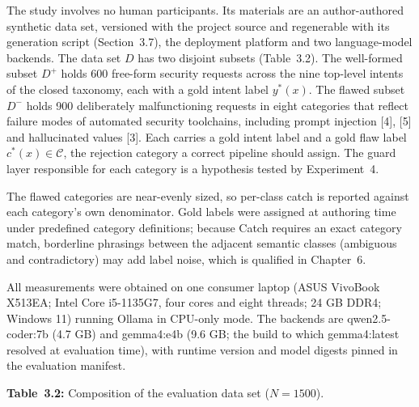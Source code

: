 \documentclass[
]{article}
\begin{document}
The study involves no human participants. Its materials are an
author-authored synthetic data set, versioned with the project source
and regenerable with its generation script (Section~3.7), the deployment
platform and two language-model backends. The data set \(D\) has two
disjoint subsets (Table~3.2). The well-formed subset \(D^{\text{+}}\)
holds 600 free-form security requests across the nine top-level intents
of the closed taxonomy, each with a gold intent label
\(y^{\text{*}}(x)\). The flawed subset \(D^{-}\) holds 900 deliberately
malfunctioning requests in eight categories that reflect failure modes
of automated security toolchains, including prompt injection {[}4{]},
{[}5{]} and hallucinated values {[}3{]}. Each carries a gold intent
label and a gold flaw label \(c^{\text{*}}(x) \in \mathcal{C}\), the
rejection category a correct pipeline should assign. The guard layer
responsible for each category is a hypothesis tested by Experiment~4.

The flawed categories are near-evenly sized, so per-class catch is
reported against each category's own denominator. Gold labels were
assigned at authoring time under predefined category definitions;
because Catch requires an exact category match, borderline phrasings
between the adjacent semantic classes (ambiguous and contradictory) may
add label noise, which is qualified in Chapter~6.

All measurements were obtained on one consumer laptop (ASUS VivoBook
X513EA; Intel Core i5-1135G7, four cores and eight threads; 24 GB DDR4;
Windows 11) running Ollama in CPU-only mode. The backends are
qwen2.5-coder:7b (4.7 GB) and gemma4:e4b (9.6 GB; the build to which
gemma4:latest resolved at evaluation time), with runtime version and
model digests pinned in the evaluation manifest.

\protect\hypertarget{_Toc900048}{}{}\textbf{Table~3.2:} Composition of
the evaluation data set (\(N = 1500\)).
\end{document}

